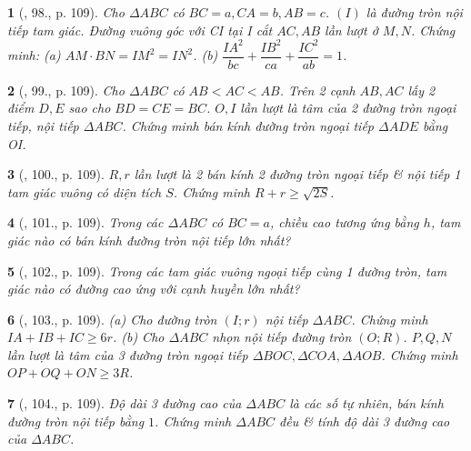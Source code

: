 \documentclass{article}
\newtheorem{baitoan}{}
\begin{document}
\begin{baitoan}[\cite{Binh_Toan_9_tap_1}, 98., p. 109]
	Cho $\Delta ABC$ có $BC = a,CA = b,AB = c$. $(I)$ là đường tròn nội tiếp tam giác. Đường vuông góc với CI tại I cắt $AC,AB$ lần lượt ở $M,N$. Chứng minh: (a) $AM\cdot BN = IM^2 = IN^2$. (b) $\dfrac{IA^2}{bc} + \dfrac{IB^2}{ca} + \dfrac{IC^2}{ab} = 1$.
\end{baitoan}

\begin{baitoan}[\cite{Binh_Toan_9_tap_1}, 99., p. 109]
	Cho $\Delta ABC$ có $AB < AC < AB$. Trên 2 cạnh $AB,AC$ lấy 2 điểm $D,E$ sao cho $BD = CE = BC$. $O,I$ lần lượt là tâm của 2 đường tròn ngoại tiếp, nội tiếp $\Delta ABC$. Chứng minh bán kính đường tròn ngoại tiếp $\Delta ADE$ bằng OI.
\end{baitoan}

\begin{baitoan}[\cite{Binh_Toan_9_tap_1}, 100., p. 109]
	$R,r$ lần lượt là 2 bán kính 2 đường tròn ngoại tiếp \& nội tiếp 1 tam giác vuông có diện tích $S$. Chứng minh $R + r\ge\sqrt{2S}$.
\end{baitoan}

\begin{baitoan}[\cite{Binh_Toan_9_tap_1}, 101., p. 109]
	Trong các $\Delta ABC$ có $BC = a$, chiều cao tương ứng bằng $h$, tam giác nào có bán kính đường tròn nội tiếp lớn nhất?
\end{baitoan}

\begin{baitoan}[\cite{Binh_Toan_9_tap_1}, 102., p. 109]
	Trong các tam giác vuông ngoại tiếp cùng 1 đường tròn, tam giác nào có đường cao ứng với cạnh huyền lớn nhất?
\end{baitoan}

\begin{baitoan}[\cite{Binh_Toan_9_tap_1}, 103., p. 109]
	(a) Cho đường tròn $(I;r)$ nội tiếp $\Delta ABC$. Chứng minh $IA + IB + IC\ge6r$. (b) Cho $\Delta ABC$  nhọn nội tiếp đường tròn $(O;R)$. $P,Q,N$ lần lượt là tâm của 3 đường tròn ngoại tiếp $\Delta BOC,\Delta COA,\Delta AOB$. Chứng minh $OP + OQ + ON\ge3R$.
\end{baitoan}

\begin{baitoan}[\cite{Binh_Toan_9_tap_1}, 104., p. 109]
	Độ dài 3 đường cao của $\Delta ABC$ là các số tự nhiên, bán kính đường tròn nội tiếp bằng $1$. Chứng minh $\Delta ABC$ đều \& tính độ dài 3 đường cao của $\Delta ABC$.
\end{baitoan}
\end{document}
